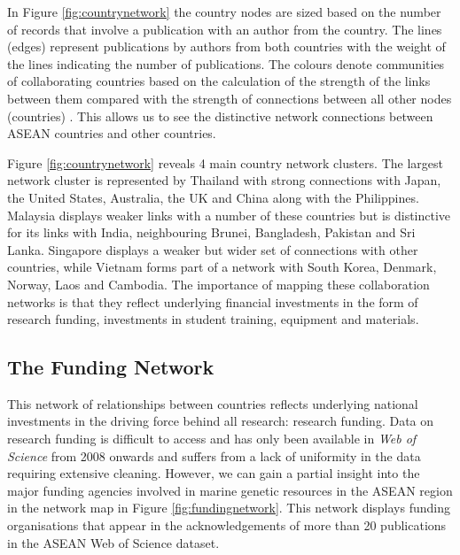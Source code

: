 \documentclass[openany]{book}
\theoremstyle{definition}
\theoremstyle{definition}
\theoremstyle{definition}
\theoremstyle{remark}
\begin{document}
In Figure \ref{fig:countrynetwork} the country nodes are sized based on
the number of records that involve a publication with an author from the
country. The lines (edges) represent publications by authors from both
countries with the weight of the lines indicating the number of
publications. The colours denote communities of collaborating countries
based on the calculation of the strength of the links between them
compared with the strength of connections between all other nodes
(countries) \citep{Blondel_2008}. This allows us to see the distinctive
network connections between ASEAN countries and other countries.

Figure \ref{fig:countrynetwork} reveals 4 main country network clusters.
The largest network cluster is represented by Thailand with strong
connections with Japan, the United States, Australia, the UK and China
along with the Philippines. Malaysia displays weaker links with a number
of these countries but is distinctive for its links with India,
neighbouring Brunei, Bangladesh, Pakistan and Sri Lanka. Singapore
displays a weaker but wider set of connections with other countries,
while Vietnam forms part of a network with South Korea, Denmark, Norway,
Laos and Cambodia. The importance of mapping these collaboration
networks is that they reflect underlying financial investments in the
form of research funding, investments in student training, equipment and
materials.

\hypertarget{the-funding-network}{%
\subsection{The Funding Network}\label{the-funding-network}}

This network of relationships between countries reflects underlying
national investments in the driving force behind all research: research
funding. Data on research funding is difficult to access and has only
been available in \emph{Web of Science} from 2008 onwards and suffers
from a lack of uniformity in the data requiring extensive cleaning.
However, we can gain a partial insight into the major funding agencies
involved in marine genetic resources in the ASEAN region in the network
map in Figure \ref{fig:fundingnetwork}. This network displays funding
organisations that appear in the acknowledgements of more than 20
publications in the ASEAN Web of Science dataset.
\end{document}
